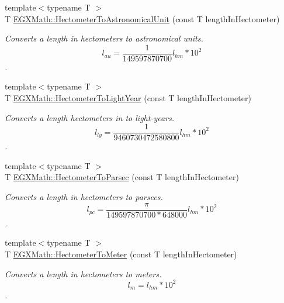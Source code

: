 \begin{DoxyCompactItemize}
\item 
{\footnotesize template$<$typename T $>$ }\\T \mbox{\hyperlink{group___e_g_x_math-_conversions-_length_conversions-_s_i-_hectometer-_astronomical_gaf66d80d2e1aeac562f9a5b67626cc46f}{E\+G\+X\+Math\+::\+Hectometer\+To\+Astronomical\+Unit}} (const T length\+In\+Hectometer)
\begin{DoxyCompactList}\small\item\em Converts a length in hectometers to astronomical units. \[ l_{au}= \frac{1}{149597870700} l_{hm} * 10^{2} \]. \end{DoxyCompactList}\item 
{\footnotesize template$<$typename T $>$ }\\T \mbox{\hyperlink{group___e_g_x_math-_conversions-_length_conversions-_s_i-_hectometer-_astronomical_ga71004aaba27ec49989b80e41e2075376}{E\+G\+X\+Math\+::\+Hectometer\+To\+Light\+Year}} (const T length\+In\+Hectometer)
\begin{DoxyCompactList}\small\item\em Converts a length hectometers in to light-\/years. \[ l_{ly}= \frac{1}{9460730472580800} l_{hm} * 10^{2} \]. \end{DoxyCompactList}\item 
{\footnotesize template$<$typename T $>$ }\\T \mbox{\hyperlink{group___e_g_x_math-_conversions-_length_conversions-_s_i-_hectometer-_astronomical_gae327abefa3e19b130dfde5d8e1f4a4ab}{E\+G\+X\+Math\+::\+Hectometer\+To\+Parsec}} (const T length\+In\+Hectometer)
\begin{DoxyCompactList}\small\item\em Converts a length in hectometers to parsecs. \[ l_{pc}=\frac{\pi}{149597870700 * 648000} l_{hm} * 10^{2} \]. \end{DoxyCompactList}\item 
{\footnotesize template$<$typename T $>$ }\\T \mbox{\hyperlink{group___e_g_x_math-_conversions-_length_conversions-_s_i-_hectometer-_s_i_ga785d53e7a9f74e669376b22db1acca4b}{E\+G\+X\+Math\+::\+Hectometer\+To\+Meter}} (const T length\+In\+Hectometer)
\begin{DoxyCompactList}\small\item\em Converts a length in hectometers to meters. \[ l_{m}=l_{hm} * 10^{2} \]. \end{DoxyCompactList}\item 

\end{DoxyCompactItemize}

